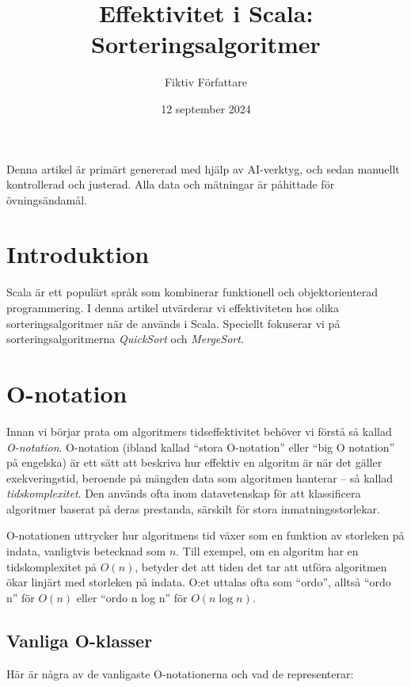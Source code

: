 \documentclass[a4paper,12pt]{article}   %
\title{Effektivitet i Scala: Sorteringsalgoritmer}
\author{Fiktiv Författare}
\date{12 september 2024}
\begin{document}
\maketitle              %

\begin{tcolorbox}[title=Notera]
    Denna artikel är primärt genererad med hjälp av AI-verktyg, och sedan manuellt kontrollerad och justerad. Alla data och mätningar är påhittade för övningsändamål.
\end{tcolorbox}

\section{Introduktion}

Scala är ett populärt språk som kombinerar funktionell och objektorienterad programmering. I denna artikel utvärderar vi effektiviteten hos olika sorteringsalgoritmer när de används i Scala. Speciellt fokuserar vi på sorteringsalgoritmerna \emph{QuickSort} och \emph{MergeSort}.

\section{O-notation}

Innan vi börjar prata om algoritmers tidseffektivitet behöver vi förstå så kallad \emph{O-notation}. O-notation (ibland kallad ``stora O-notation'' eller ``big O notation'' på engelska) är ett sätt att beskriva hur effektiv en algoritm är när det gäller exekveringstid, beroende på mängden data som algoritmen hanterar -- så kallad \emph{tidskomplexitet}. Den används ofta inom datavetenskap för att klassificera algoritmer baserat på deras prestanda, särskilt för stora inmatningsstorlekar.

O-notationen uttrycker hur algoritmens tid växer som en funktion av storleken på indata, vanligtvis betecknad som $n$. Till exempel, om en algoritm har en tidskomplexitet på $O(n)$, betyder det att tiden det tar att utföra algoritmen ökar linjärt med storleken på indata. O:et uttalas ofta som ``ordo'', alltså ``ordo n'' för $O(n)$ eller ``ordo n log n'' för $O(n \log n)$.

\subsection{Vanliga O-klasser}

Här är några av de vanligaste O-notationerna och vad de representerar:
\end{document}
